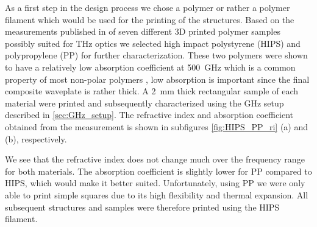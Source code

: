 As a first step in the design process we chose a polymer or rather a polymer filament which would be used for the printing of the structures. Based on the measurements published in \cite{Busch2014} of seven different 3D printed polymer samples possibly suited for THz optics we selected high impact polystyrene (HIPS) and polypropylene (PP) for further characterization. These two polymers were shown to have a relatively low absorption coefficient at \SI{500}{\giga \hertz} which is a common property of most non-polar polymers \cite{Jordens2010, Castro-Camus2020}, low absorption is important since the final composite waveplate is rather thick. A \SI{2}{\milli \meter} thick rectangular sample of each material were printed and subsequently characterized using the GHz setup described in \ref{sec:GHz_setup}. The refractive index and absorption coefficient obtained from the measurement is shown in subfigures \ref{fig:HIPS_PP_ri} (a) and (b), respectively.
 
We see that the refractive index does not change much over the frequency range for both materials. The absorption coefficient is slightly lower for PP compared to HIPS, which would make it better suited. Unfortunately, using PP we were only able to print simple squares due to its high flexibility and thermal expansion. All subsequent structures and samples were therefore printed using the HIPS filament.

